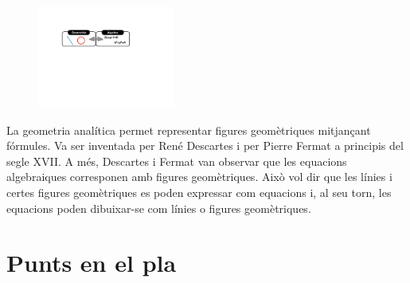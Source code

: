  

\begin{blueshaded}
	\begin{figure}
		\begin{center}
			\includegraphics[width=0.4\textwidth]{img-09/analitica}
		\end{center}
	\end{figure}
	La geometria analítica permet representar figures geomètriques mitjançant fórmules.  
	Va ser inventada per René Descartes i per Pierre Fermat  a principis del segle XVII.
	A més, Descartes i Fermat van observar  que les equacions algebraiques corresponen amb figures geomètriques. Això vol dir que les línies i certes figures geomètriques es poden expressar com equacions i, al seu torn, les equacions poden dibuixar-se com línies o figures geomètriques. 	
\end{blueshaded}

\section{Punts en el pla}


